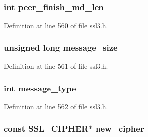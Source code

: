 \subsubsection[{\texorpdfstring{peer\+\_\+finish\+\_\+md\+\_\+len}{peer_finish_md_len}}]{\setlength{\rightskip}{0pt plus 5cm}int peer\+\_\+finish\+\_\+md\+\_\+len}\hypertarget{structssl3__state__st_a283c246476da32831e4ea2377ad6d59b}{}\label{structssl3__state__st_a283c246476da32831e4ea2377ad6d59b}


Definition at line 560 of file ssl3.\+h.

\subsubsection[{\texorpdfstring{message\+\_\+size}{message_size}}]{\setlength{\rightskip}{0pt plus 5cm}unsigned long message\+\_\+size}\hypertarget{structssl3__state__st_a1610dd976a8263e72c00ca04c15e6786}{}\label{structssl3__state__st_a1610dd976a8263e72c00ca04c15e6786}


Definition at line 561 of file ssl3.\+h.

\subsubsection[{\texorpdfstring{message\+\_\+type}{message_type}}]{\setlength{\rightskip}{0pt plus 5cm}int message\+\_\+type}\hypertarget{structssl3__state__st_aa4ee43acabd9844dd67caa5015709b89}{}\label{structssl3__state__st_aa4ee43acabd9844dd67caa5015709b89}


Definition at line 562 of file ssl3.\+h.

\subsubsection[{\texorpdfstring{new\+\_\+cipher}{new_cipher}}]{\setlength{\rightskip}{0pt plus 5cm}const {\bf S\+S\+L\+\_\+\+C\+I\+P\+H\+ER}$\ast$ new\+\_\+cipher}\hypertarget{structssl3__state__st_a6d0804e086a148c06053dea47812ec91}{}\label{structssl3__state__st_a6d0804e086a148c06053dea47812ec91}


